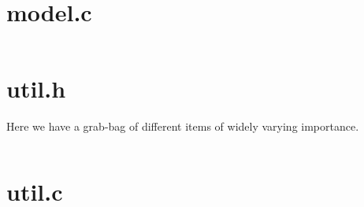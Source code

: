 \documentclass[10pt, fleqn]{article}
\theoremstyle{break}
\newcommand{\0}    {\mathbf{0}}
\numberwithin{equation}{section}
\begin{document}
\section{model.c}
\begin{multicols}{2}
\inputminted[mathescape,
               linenos,
               firstnumber=last,
               numbersep=5pt,
               gobble=0,
               frame=none,
               fontsize=\tiny,
               framesep=2mm]{c}{../model.c}
\end{multicols}

\pagebreak
\section{util.h}
\begin{snugshade}
Here we have a grab-bag of different items of widely varying importance.
\end{snugshade}
\inputminted[mathescape,
               linenos,
               firstnumber=last,
               numbersep=5pt,
               gobble=0,
               frame=none,
               fontsize=\small,
               framesep=2mm]{c}{../util.h}
\section{util.c}
\begin{multicols}{2}
\inputminted[mathescape,
               linenos,
               firstnumber=last,
               numbersep=5pt,
               gobble=0,
               frame=none,
               fontsize=\tiny,
               framesep=2mm]{c}{../util.c}
\end{multicols}


\end{document}
